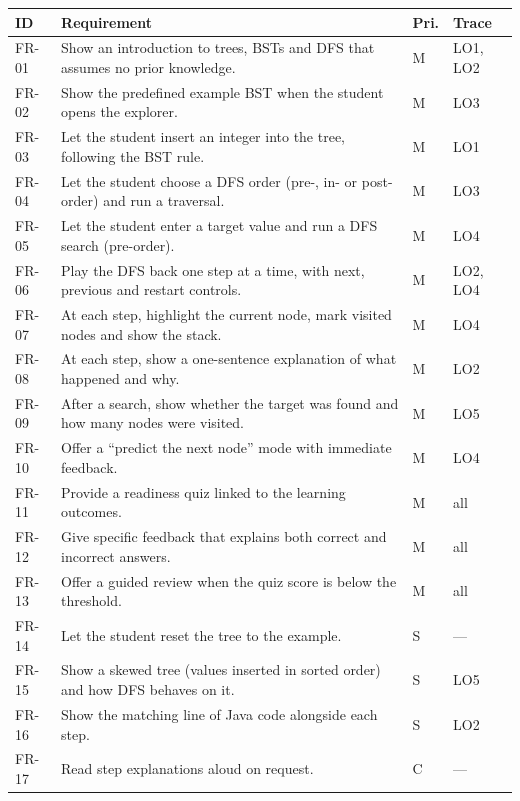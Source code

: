 \documentclass[11pt,a4paper]{article}
\begin{document}
\begin{longtable}{@{}p{1.2cm} p{11.2cm} p{0.9cm} p{1.1cm}@{}}
  \toprule
  \textbf{ID} & \textbf{Requirement} & \textbf{Pri.} & \textbf{Trace} \\
  \midrule
  \endhead
  FR-01 & Show an introduction to trees, BSTs and DFS that assumes no prior knowledge. & M & LO1, LO2 \\
  FR-02 & Show the predefined example BST when the student opens the explorer. & M & LO3 \\
  FR-03 & Let the student insert an integer into the tree, following the BST rule. & M & LO1 \\
  FR-04 & Let the student choose a DFS order (pre-, in- or post-order) and run a traversal. & M & LO3 \\
  FR-05 & Let the student enter a target value and run a DFS search (pre-order). & M & LO4 \\
  FR-06 & Play the DFS back one step at a time, with next, previous and restart controls. & M & LO2, LO4 \\
  FR-07 & At each step, highlight the current node, mark visited nodes and show the stack. & M & LO4 \\
  FR-08 & At each step, show a one-sentence explanation of what happened and why. & M & LO2 \\
  FR-09 & After a search, show whether the target was found and how many nodes were visited. & M & LO5 \\
  FR-10 & Offer a ``predict the next node'' mode with immediate feedback. & M & LO4 \\
  FR-11 & Provide a readiness quiz linked to the learning outcomes. & M & all \\
  FR-12 & Give specific feedback that explains both correct and incorrect answers. & M & all \\
  FR-13 & Offer a guided review when the quiz score is below the threshold. & M & all \\
  FR-14 & Let the student reset the tree to the example. & S & --- \\
  FR-15 & Show a skewed tree (values inserted in sorted order) and how DFS behaves on it. & S & LO5 \\
  FR-16 & Show the matching line of Java code alongside each step. & S & LO2 \\
  FR-17 & Read step explanations aloud on request. & C & --- \\
  \bottomrule
\end{longtable}
\end{document}

